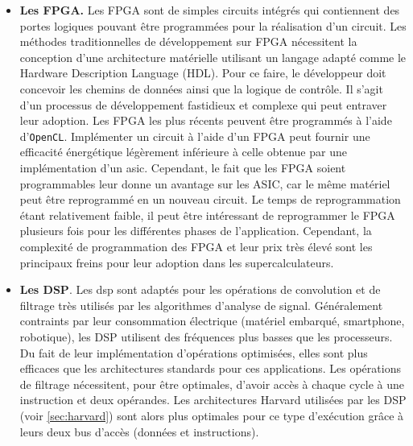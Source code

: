 \begin{enumerate}
\begin{itemize}
                    \item\textbf{Les FPGA.}  Les \gls{FPGA} sont de simples circuits intégrés qui contiennent des portes logiques pouvant être programmées pour la réalisation d'un circuit. 
                    Les méthodes traditionnelles de développement sur FPGA nécessitent la conception d'une architecture matérielle utilisant un langage adapté comme le Hardware Description Language (HDL). Pour ce faire, le développeur doit concevoir les chemins de données ainsi que la logique de contrôle. Il s'agit d'un processus de développement fastidieux et complexe qui peut entraver leur adoption. Les FPGA les plus récents peuvent être programmés à l'aide d'\verb|OpenCL|.
                    Implémenter un circuit à l'aide d'un FPGA peut fournir une efficacité énergétique légèrement inférieure à celle obtenue par une implémentation d'un \gls{asic}. Cependant, le fait que les FPGA soient programmables leur donne un avantage sur les ASIC, car le même matériel peut être reprogrammé en un nouveau circuit. Le temps de reprogrammation étant relativement faible, il peut être intéressant de reprogrammer le FPGA plusieurs fois pour les différentes phases de l'application. Cependant, la complexité de programmation des FPGA et leur prix très élevé sont les principaux freins pour leur adoption dans les supercalculateurs.        
                    
                    \item\textbf{Les DSP}. Les \gls{dsp} sont adaptés pour les opérations de convolution et de filtrage très utilisés par les algorithmes d'analyse de signal. Généralement contraints par leur consommation électrique (matériel embarqué, smartphone, robotique), les DSP utilisent des fréquences plus basses que les processeurs. Du fait de leur implémentation d'opérations optimisées, elles sont plus efficaces que les architectures standards pour ces applications. Les opérations de filtrage nécessitent, pour être optimales, d'avoir accès à chaque cycle à une instruction et deux opérandes. Les architectures Harvard utilisées par les DSP (voir \autoref{sec:harvard}) sont alors plus optimales pour ce type d'exécution grâce à leurs deux bus d'accès (données et instructions).
                     
             \end{itemize}
             

\end{enumerate}
